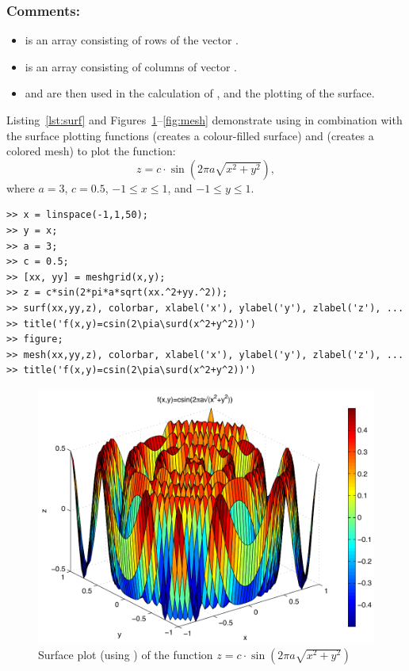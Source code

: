 \subsubsection{Comments:}
\begin{itemize}
\item {} is an array consisting of rows of the vector .
\item {} is an array consisting of columns of vector .
\item {} and  are then used in the calculation of , and the plotting of the surface. 
\end{itemize}
Listing~\ref{lst:surf} and Figures~\ref{fig:surf}--\ref{fig:mesh} demonstrate using  in combination with the surface plotting functions  (creates a colour-filled surface) and  (creates a colored mesh) to plot the function:
\begin{equation*}
z=c \cdot \sin\left( 2\pi a \sqrt{x^2+y^2} \right),
\end{equation*}
where $a=3$, $c=0.5$, $-1\leq x \leq 1$, and $-1\leq y \leq 1$.
\begin{lstlisting}[caption={Plotting a surface},label=lst:surf]
>> x = linspace(-1,1,50);
>> y = x;
>> a = 3;
>> c = 0.5;
>> [xx, yy] = meshgrid(x,y);
>> z = c*sin(2*pi*a*sqrt(xx.^2+yy.^2));
>> surf(xx,yy,z), colorbar, xlabel('x'), ylabel('y'), zlabel('z'), ...
>> title('f(x,y)=csin(2\pia\surd(x^2+y^2))')
>> figure;
>> mesh(xx,yy,z), colorbar, xlabel('x'), ylabel('y'), zlabel('z'), ...
>> title('f(x,y)=csin(2\pia\surd(x^2+y^2))')
\end{lstlisting}
\begin{figure}[h!]
	\myfloatalign
	\includegraphics[width=\linewidth]{Graphics/Unit02/surf}
	\caption{Surface plot (using ) of the function $z=c \cdot \sin( 2\pi a \sqrt{x^2+y^2})$}
	\label{fig:surf}
\end{figure}

